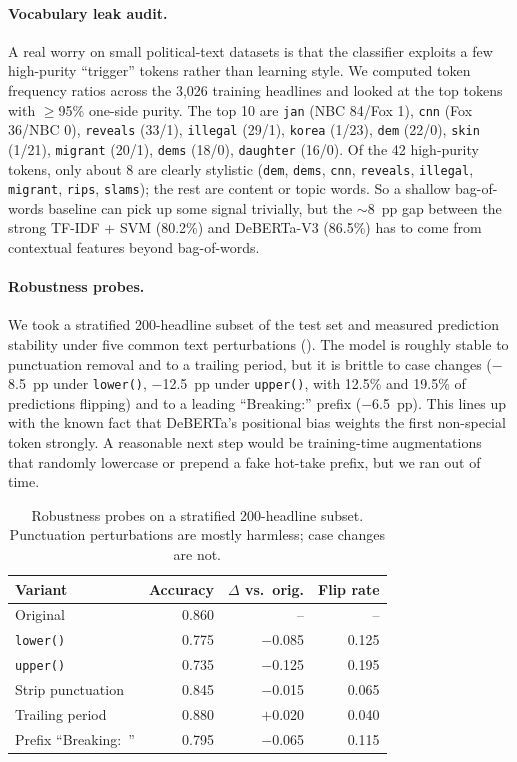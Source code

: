 \documentclass[10pt]{article}
\begin{document}
\paragraph{Vocabulary leak audit.} A real worry on small political-text datasets is that the classifier exploits a few high-purity ``trigger'' tokens rather than learning style. We computed token frequency ratios across the 3{,}026 training headlines and looked at the top tokens with $\geq$95\% one-side purity. The top 10 are \texttt{jan} (NBC 84/Fox 1), \texttt{cnn} (Fox 36/NBC 0), \texttt{reveals} (33/1), \texttt{illegal} (29/1), \texttt{korea} (1/23), \texttt{dem} (22/0), \texttt{skin} (1/21), \texttt{migrant} (20/1), \texttt{dems} (18/0), \texttt{daughter} (16/0). Of the 42 high-purity tokens, only about 8 are clearly stylistic (\texttt{dem}, \texttt{dems}, \texttt{cnn}, \texttt{reveals}, \texttt{illegal}, \texttt{migrant}, \texttt{rips}, \texttt{slams}); the rest are content or topic words. So a shallow bag-of-words baseline can pick up some signal trivially, but the $\sim$8~pp gap between the strong TF-IDF + SVM (80.2\%) and DeBERTa-V3 (86.5\%) has to come from contextual features beyond bag-of-words.

\paragraph{Robustness probes.} We took a stratified 200-headline subset of the test set and measured prediction stability under five common text perturbations (). The model is roughly stable to punctuation removal and to a trailing period, but it is brittle to case changes ($-$8.5~pp under \texttt{lower()}, $-$12.5~pp under \texttt{upper()}, with 12.5\% and 19.5\% of predictions flipping) and to a leading ``Breaking:'' prefix ($-$6.5~pp). This lines up with the known fact that DeBERTa's positional bias weights the first non-special token strongly. A reasonable next step would be training-time augmentations that randomly lowercase or prepend a fake hot-take prefix, but we ran out of time.

\begin{table}[t]
\centering
\small
\caption{Robustness probes on a stratified 200-headline subset. Punctuation perturbations are mostly harmless; case changes are not.}
\label{tab:robust}
\begin{tabular}{l rrr}
\toprule
\textbf{Variant} & \textbf{Accuracy} & \textbf{$\Delta$ vs.\ orig.} & \textbf{Flip rate} \\
\midrule
Original                    & 0.860 & --       & --     \\
\texttt{lower()}            & 0.775 & $-$0.085 & 0.125 \\
\texttt{upper()}            & 0.735 & $-$0.125 & 0.195 \\
Strip punctuation           & 0.845 & $-$0.015 & 0.065 \\
Trailing period             & 0.880 & $+$0.020 & 0.040 \\
Prefix ``Breaking:~''       & 0.795 & $-$0.065 & 0.115 \\
\bottomrule
\end{tabular}
\end{table}
\end{document}
